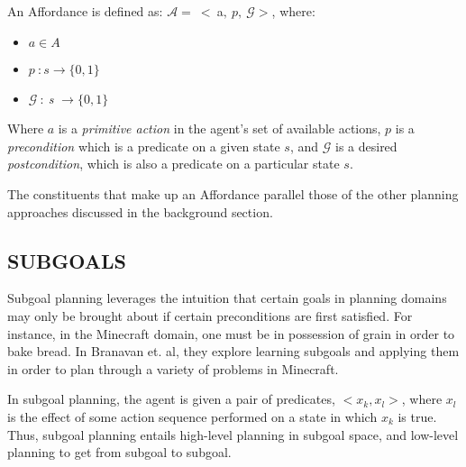 \documentclass[]{article}
\begin{document}

An Affordance is defined as: $\mathcal{A} =\ <\ $a$ ,\ p,\ \mathcal{G}>$, where:

\begin{itemize}
\item[] $a \in A$
\item[] $p\ : s \rightarrow \{0,1\}$
\item[] $ \mathcal{G}\ :\ ${\it s }$ \rightarrow \{$0$,1\}$
\end{itemize}

Where $a$ is a {\it primitive action} in the agent's set of available actions, $p$ is a {\it precondition} which is a predicate on a given state $s$, and $\mathcal{G}$ is a desired {\it postcondition}, which is also a predicate on a particular state $s$.

The constituents that make up an Affordance parallel those of the other planning approaches discussed in the background section.

\subsection{SUBGOALS}
Subgoal planning leverages the intuition that certain goals in planning domains may only be brought about if certain preconditions are first satisfied. For instance, in the Minecraft domain, one must be in possession of grain in order to bake bread. In Branavan et. al, they explore learning subgoals and applying them in order to plan through a variety of problems in Minecraft.

In subgoal planning, the agent is given a pair of predicates, $<x_k, x_l >$, where $x_l$ is the effect of some action sequence performed on a state in which $x_k$ is true. Thus, subgoal planning entails high-level planning in subgoal space, and low-level planning to get from subgoal to subgoal.
\end{document}

